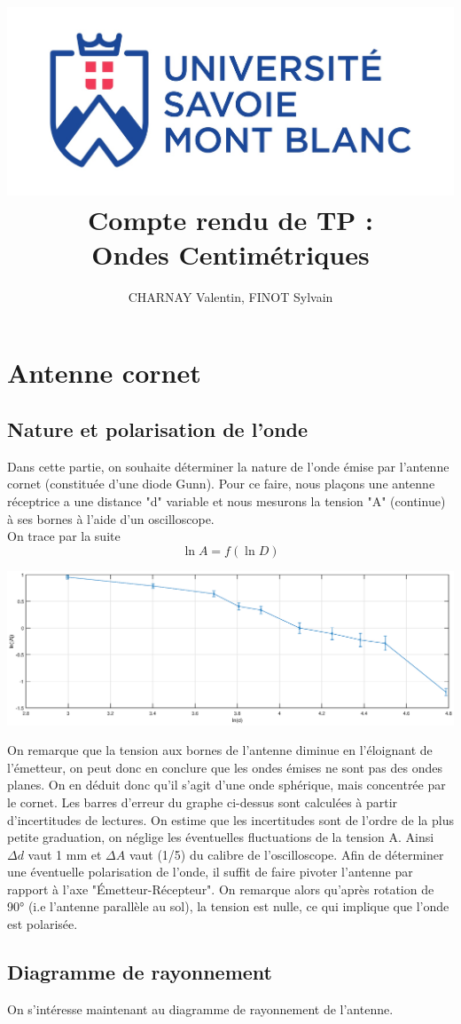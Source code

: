 \documentclass[12pt,a4paper]{article}
\author{CHARNAY Valentin, FINOT Sylvain}
\title{\includegraphics[scale=0.4]{logousmb}\\
Compte rendu de TP : \\ Ondes Centimétriques}
\begin{document}
	\maketitle
	\section{Antenne cornet}
	\subsection{Nature et polarisation de l'onde}
	Dans cette partie, on souhaite déterminer la nature de l'onde émise par l'antenne cornet (constituée d'une diode Gunn). Pour ce faire, nous plaçons une antenne réceptrice a une distance "d" variable et nous mesurons la tension "A" (continue) à ses bornes à l'aide d'un oscilloscope.\\
	On trace par la suite
	$$\ln A = f(\ln D)$$
	\begin{bigcenter}
		\includegraphics[scale=0.5]{matlab/lnA}
	\end{bigcenter}
	On remarque que la tension aux bornes de l'antenne diminue en l'éloignant de l'émetteur, on peut donc en conclure que les ondes émises ne sont pas des ondes planes. On en déduit donc qu'il s'agit d'une onde sphérique, mais concentrée par le cornet. Les barres d'erreur du graphe ci-dessus sont calculées à partir d'incertitudes de lectures. On estime que les incertitudes sont de l'ordre de la plus petite graduation, on néglige les éventuelles fluctuations de la tension A. Ainsi $\Delta d$ vaut 1 mm et $\Delta A$ vaut (1/5) du calibre de l'oscilloscope.
	Afin de déterminer une éventuelle polarisation de l'onde, il suffit de faire pivoter l'antenne par rapport à l'axe "Émetteur-Récepteur". On remarque alors qu'après rotation de 90° (i.e l'antenne parallèle au sol), la tension est nulle, ce qui implique que l'onde est polarisée.
	\subsection{Diagramme de rayonnement}
	On s'intéresse maintenant au diagramme de rayonnement de l'antenne.
	
\end{document}

